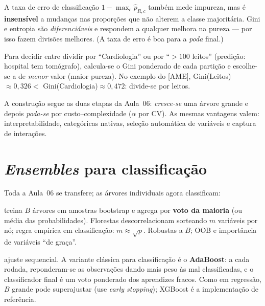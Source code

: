 \documentclass[11pt,a4paper]{article}
\begin{document}
\begin{observacao}
A taxa de erro de classificação $1-\max_c \widehat p_{R,c}$ também mede impureza,
mas é \textbf{insensível} a mudanças nas proporções que não alterem a classe
majoritária. Gini e entropia são \emph{diferenciáveis} e respondem a qualquer
melhora na pureza --- por isso fazem divisões melhores. (A taxa de erro é boa para a
\emph{poda} final.)
\end{observacao}

\begin{exemplo}
Para decidir entre dividir por ``Cardiologia'' ou por ``$>100$ leitos'' (predição:
hospital tem tomógrafo), calcula-se o Gini ponderado de cada partição e escolhe-se a
de \emph{menor} valor (maior pureza). No exemplo do [AME], Gini(Leitos)$\approx
0{,}326 <$ Gini(Cardiologia)$\approx 0{,}472$: divide-se por leitos.
\end{exemplo}

\noindent A construção segue as duas etapas da Aula~06: \emph{cresce-se} uma árvore
grande e depois \emph{poda-se} por custo--complexidade ($\alpha$ por CV). As mesmas
vantagens valem: interpretabilidade, categóricas nativas, seleção automática de
variáveis e captura de interações.

\section{\emph{Ensembles} para classificação}
Toda a Aula~06 se transfere; as árvores individuais agora classificam:
\begin{description}[leftmargin=2.6cm,style=nextline]
  \item[Bagging / Florestas] treina $B$ árvores em amostras bootstrap e agrega por
        \textbf{voto da maioria} (ou média das probabilidades). Florestas
        descorrelacionam sorteando $m$ variáveis por nó; regra empírica em
        classificação: $m\approx\sqrt{p}$. Robustas a $B$; OOB e importância de
        variáveis ``de graça''.
  \item[Boosting] ajuste sequencial. A variante clássica para classificação é o
        \textbf{AdaBoost}: a cada rodada, reponderam-se as observações dando mais
        peso às mal classificadas, e o classificador final é um voto ponderado dos
        aprendizes fracos. Como em regressão, $B$ grande pode superajustar (use
        \emph{early stopping}); XGBoost é a implementação de referência.
\end{description}
\end{document}
